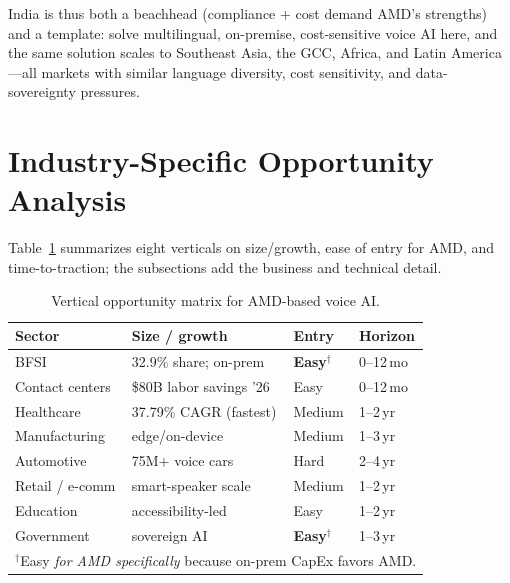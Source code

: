 \documentclass[blind]{gtac}
\begin{document}
India is thus both a beachhead (compliance + cost demand AMD's strengths) and a template: solve multilingual, on-premise, cost-sensitive voice AI here, and the same solution scales to Southeast Asia, the GCC, Africa, and Latin America---all markets with similar language diversity, cost sensitivity, and data-sovereignty pressures.

\section{Industry-Specific Opportunity Analysis}
\label{sec:sectors}

Table~\ref{tab:sectors} summarizes eight verticals on size/growth, ease of entry for AMD, and time-to-traction; the subsections add the business and technical detail.

\begin{table}[H]
\centering
\caption{Vertical opportunity matrix for AMD-based voice AI.}
\label{tab:sectors}
\tiny
\begin{tabular}{@{}p{0.72in}p{0.86in}p{0.42in}p{0.5in}@{}}
\toprule
Sector & Size / growth & Entry & Horizon \\
\midrule
BFSI & 32.9\% share; on-prem & \textbf{Easy}$^{\dagger}$ & 0--12\,mo \\
Contact centers & \$80B labor savings '26 & Easy & 0--12\,mo \\
Healthcare & 37.79\% CAGR (fastest) & Medium & 1--2\,yr \\
Manufacturing & edge/on-device & Medium & 1--3\,yr \\
Automotive & 75M+ voice cars & Hard & 2--4\,yr \\
Retail / e-comm & smart-speaker scale & Medium & 1--2\,yr \\
Education & accessibility-led & Easy & 1--2\,yr \\
Government & sovereign AI & \textbf{Easy}$^{\dagger}$ & 1--3\,yr \\
\bottomrule
\multicolumn{4}{l}{$^{\dagger}$Easy \emph{for AMD specifically} because on-prem CapEx favors AMD.}
\end{tabular}
\end{table}
\end{document}
